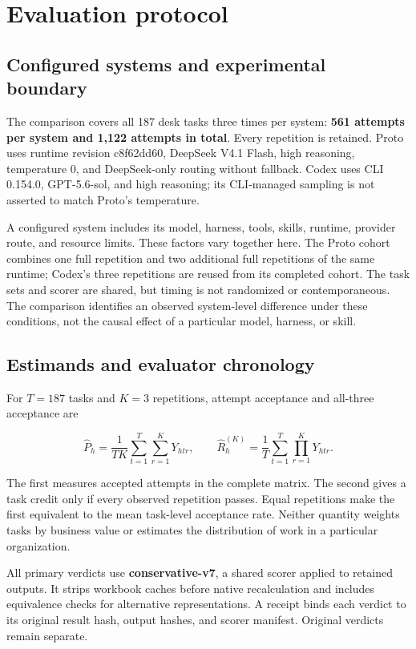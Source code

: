\section{Evaluation protocol}\label{sec:3}

\subsection{Configured systems and experimental boundary}\label{configured-systems-and-experimental-boundary}

The comparison covers all 187 desk tasks three times per system: \textbf{561 attempts per system and 1,122 attempts in total}. Every repetition is retained. Proto uses runtime revision c8f62dd60, DeepSeek V4.1 Flash, high reasoning, temperature 0, and DeepSeek-only routing without fallback. Codex uses CLI 0.154.0, GPT-5.6-sol, and high reasoning; its CLI-managed sampling is not asserted to match Proto's temperature.

A configured system includes its model, harness, tools, skills, runtime, provider route, and resource limits. These factors vary together here. The Proto cohort combines one full repetition and two additional full repetitions of the same runtime; Codex's three repetitions are reused from its completed cohort. The task sets and scorer are shared, but timing is not randomized or contemporaneous. The comparison identifies an observed system-level difference under these conditions, not the causal effect of a particular model, harness, or skill.

\subsection{Estimands and evaluator chronology}\label{estimands-and-evaluator-chronology}

For \(T=187\) tasks and \(K=3\) repetitions, attempt acceptance and all-three acceptance are

\[
\widehat P_h=\frac{1}{TK}\sum_{t=1}^{T}\sum_{r=1}^{K}Y_{htr},
\qquad
\widehat R_h^{(K)}=\frac{1}{T}\sum_{t=1}^{T}\prod_{r=1}^{K}Y_{htr}.
\]

The first measures accepted attempts in the complete matrix. The second gives a task credit only if every observed repetition passes. Equal repetitions make the first equivalent to the mean task-level acceptance rate. Neither quantity weights tasks by business value or estimates the distribution of work in a particular organization.

All primary verdicts use \textbf{conservative-v7}, a shared scorer applied to retained outputs. It strips workbook caches before native recalculation and includes equivalence checks for alternative representations. A receipt binds each verdict to its original result hash, output hashes, and scorer manifest. Original verdicts remain separate.

